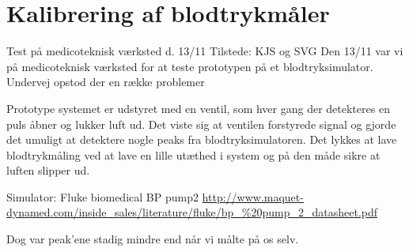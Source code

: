 \section{Kalibrering af blodtrykmåler} \label{app:kalibreringstest}
Test på medicoteknisk værksted d. 13/11
Tilstede: KJS og SVG
Den 13/11 var vi på medicoteknisk værksted for at teste prototypen på et blodtryksimulator. Undervej opstod der en række problemer

Prototype systemet er udstyret med en ventil, som hver gang der detekteres en puls åbner og lukker luft ud. Det viste sig at ventilen forstyrede signal og gjorde det umuligt at detektere nogle peaks fra blodtryksimulatoren. Det lykkes at lave blodtrykmåling ved at lave en lille utæthed i system og på den måde sikre at luften slipper ud. 

Simulator: 
Fluke biomedical BP pump2
\url{http://www.maquet-dynamed.com/inside_sales/literature/fluke/bp_\%20pump_2_datasheet.pdf}

Dog var peak’ene stadig mindre end når vi målte på os selv. 

